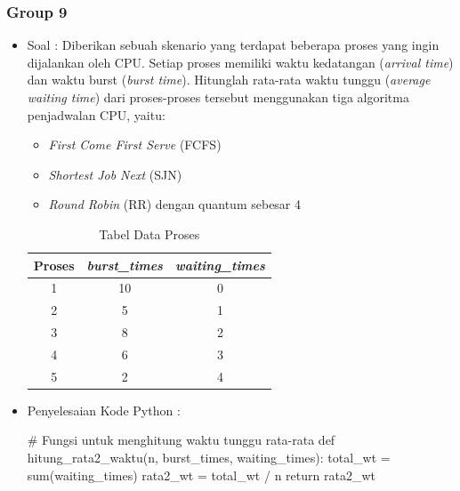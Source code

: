 \documentclass[12pt]{article}
\begin{document}
\subsubsection{Group 9}
\begin{itemize}
    \item Soal : Diberikan sebuah skenario yang terdapat beberapa proses yang ingin dijalankan oleh CPU. Setiap proses memiliki waktu kedatangan (\textit{arrival time}) dan waktu burst (\textit{burst time}). Hitunglah rata-rata waktu tunggu (\textit{average waiting time}) dari proses-proses tersebut menggunakan tiga algoritma penjadwalan CPU, yaitu:
    \begin{itemize}
        \item \textit{First Come First Serve} (FCFS)
        \item \textit{Shortest Job Next} (SJN)
        \item \textit{Round Robin} (RR) dengan quantum sebesar 4
    \end{itemize}
    
    \begin{table}[h!]
    \centering
    \begin{tabular}{|c|c|c|}
        \hline
        \textbf{Proses} & \textbf{\textit{burst\_times}} & \textbf{\textit{waiting\_times}} \\ 
        \hline
        1              & 10                   & 0                         \\ 
        \hline
        2              & 5                    & 1                         \\ 
        \hline
        3              & 8                    & 2                         \\ 
        \hline
        4              & 6                    & 3                         \\ 
        \hline
        5              & 2                    & 4                         \\ 
        \hline
        \end{tabular}
        \caption{Tabel Data Proses}
        \label{tabel:proses}
    \end{table}
    \item Penyelesaian Kode Python :
    \begin{python}
# Fungsi untuk menghitung waktu tunggu rata-rata
def hitung_rata2_waktu(n, burst_times, waiting_times):
    total_wt = sum(waiting_times)
    rata2_wt = total_wt / n
    return rata2_wt


\end{python}
\end{itemize}
\end{document}

